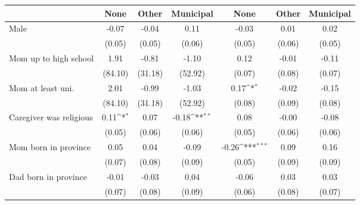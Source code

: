 {
\def\sym#1{\ifmmode^{#1}\else\(^{#1}\)\fi}
\begin{tabular}{l*{6}{c}}
\toprule
                    &\multicolumn{1}{c}{None}&\multicolumn{1}{c}{Other}&\multicolumn{1}{c}{Municipal}&\multicolumn{1}{c}{None}&\multicolumn{1}{c}{Other}&\multicolumn{1}{c}{Municipal}\\
\midrule
Male                &       -0.07         &       -0.04         &        0.11         &       -0.03         &        0.01         &        0.02         \\
                    &      (0.05)         &      (0.05)         &      (0.06)         &      (0.05)         &      (0.06)         &      (0.05)         \\
\addlinespace
Mom up to high school &        1.91         &       -0.81         &       -1.10         &        0.12         &       -0.01         &       -0.11         \\
                    &     (84.10)         &     (31.18)         &     (52.92)         &      (0.07)         &      (0.08)         &      (0.07)         \\
\addlinespace
Mom at least uni. &        2.01         &       -0.99         &       -1.03         &        0.17\sym{*}  &       -0.02         &       -0.15         \\
                    &     (84.10)         &     (31.18)         &     (52.92)         &      (0.08)         &      (0.09)         &      (0.08)         \\
\addlinespace
Caregiver was religious&        0.11\sym{*}  &        0.07         &       -0.18\sym{**} &        0.08         &       -0.00         &       -0.08         \\
                    &      (0.05)         &      (0.06)         &      (0.06)         &      (0.05)         &      (0.06)         &      (0.06)         \\
\addlinespace
Mom born in province&        0.05         &        0.04         &       -0.09         &       -0.26\sym{***}&        0.09         &        0.16         \\
                    &      (0.07)         &      (0.08)         &      (0.09)         &      (0.05)         &      (0.09)         &      (0.09)         \\
\addlinespace
Dad born in province&       -0.01         &       -0.03         &        0.04         &       -0.06         &        0.03         &        0.03         \\
                    &      (0.07)         &      (0.08)         &      (0.09)         &      (0.06)         &      (0.08)         &      (0.07)         \\

\end{tabular}}

